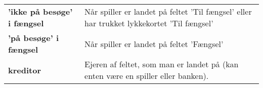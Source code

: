 \documentclass[class=article, crop=false]{standalone}
\begin{document}
    \begin{table}[H]
        \begin{tabularx}{\textwidth}{lX}

            \textbf{'ikke på besøge' i fængsel}& Når spiller er landet på feltet
                                            'Til fængsel' eller har trukket
                                             lykkekortet 'Til fængsel' \\
            \textbf{'på besøge' i fængsel}   & Når spiller er landet på feltet 'Fængsel'\\

            \textbf{kreditor}   & Ejeren af feltet, som man er landet på (kan enten være en spiller eller banken).\\

        \end{tabularx}
    \end{table}
\end{document}
